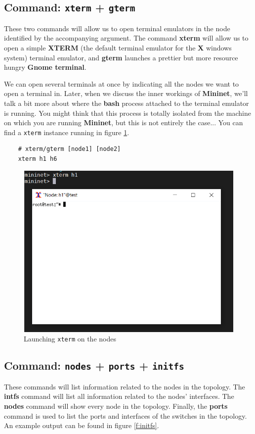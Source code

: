 \documentclass[12pt]{article}
\newcommand{\newpar} {
    \vskip 1cm
}
\begin{document}
	\subsection{Command: \texttt{xterm} + \texttt{gterm}}
		These two commands will allow us to open terminal emulators in the node identified by the accompanying argument. The command \textbf{xterm} will allow us to open a simple \textbf{XTERM} (the default terminal emulator for the \textbf{X} windows system) terminal emulator, and \textbf{gterm} launches a prettier but more resource hungry \textbf{Gnome terminal}.
		\newpar
		We can open several terminals at once by indicating all the nodes we want to open a terminal in. Later, when we discuss the inner workings of \textbf{Mininet}, we'll talk a bit more about where the \textbf{bash} process attached to the terminal emulator is running. You might think that this process is totally isolated from the machine on which you are running \textbf{Mininet}, but this is not entirely the case... You can find a \texttt{xterm} instance running in figure \ref{f:xterm}.
        \newpar
		\begin{verbatim}
	# xterm/gterm [node1] [node2]
	xterm h1 h6
		\end{verbatim}
        \newpage
		\begin{figure}[!htb]
			\centering
			\includegraphics[width=\linewidth]{xterm.png}
			\caption{Launching \texttt{xterm} on the nodes}
			\label{f:xterm}
		\end{figure}

	\subsection{Command: \texttt{nodes} + \texttt{ports} + \texttt{initfs}}
		These commands will list information related to the nodes in the topology. The \textbf{intfs} command will list all information related to the nodes' interfaces. The  \textbf{nodes} command will show every node in the topology. Finally, the \textbf{ports} command is used to list the ports and interfaces of the switches in the topology. An example output can be found in figure \ref{f:initfs}.
        
\end{document}
